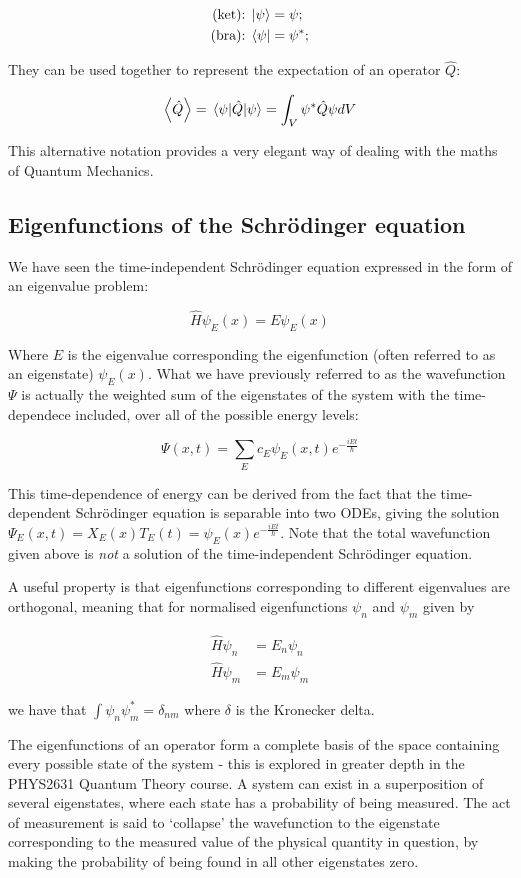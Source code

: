 \begin{align*} 
\text{(ket):\;} &\ket{\psi} = \psi; \\ 
\text{(bra):\;} &\bra{\psi} = \psi^*; 
\end{align*}

They can be used together to represent the expectation of an operator $\hat{Q}$:

\[ \expval{\hat{Q}} = \expval{\hat{Q}}{\psi} = \int_{V} \psi^*\hat{Q}\psi dV \]

This alternative notation provides a very elegant way of dealing with the maths of Quantum Mechanics. 

\subsection{Eigenfunctions of the Schr\"odinger equation}

We have seen the time-independent Schr\"odinger equation expressed in the form of an eigenvalue problem:

\[ \hat{H}\psi_E(x) = E\psi_E(x) \]

Where $E$ is the eigenvalue corresponding the eigenfunction (often referred to as an eigenstate) $\psi_E(x)$. What we have previously referred to as the wavefunction $\Psi$ is actually the weighted sum of the eigenstates of the system with the time-dependece included, over all of the possible energy levels:

\[ \Psi(x,t) = \sum_E c_E \psi_E(x,t) e^{-\frac{iEt}{\hbar}} \]

This time-dependence of energy can be derived from the fact that the time-dependent Schr\"odinger equation is separable into two ODEs, giving the solution $\Psi_E(x,t) = X_E(x)T_E(t) = \psi_E(x)e^{-\frac{iEt}{\hbar}}$. Note that the total wavefunction given above is \emph{not} a solution of the time-independent Schr\"odinger equation. 

A useful property is that eigenfunctions corresponding to different eigenvalues are orthogonal, meaning that for normalised eigenfunctions $\psi_n$ and $\psi_m$ given by

\begin{align*}
\hat{H}\psi_n &= E_n\psi_n \\
\hat{H}\psi_m &= E_m\psi_m
\end{align*}

we have that $\int \psi_n \psi_m^* = \delta_{nm}$ where $\delta$ is the Kronecker delta. 

The eigenfunctions of an operator form a complete basis of the space containing every possible state of the system - this is explored in greater depth in the PHYS2631 Quantum Theory course. A system can exist in a superposition of several eigenstates, where each state has a probability of being measured. The act of measurement is said to `collapse' the wavefunction to the eigenstate corresponding to the measured value of the physical quantity in question, by making the probability of being found in all other eigenstates zero. 

